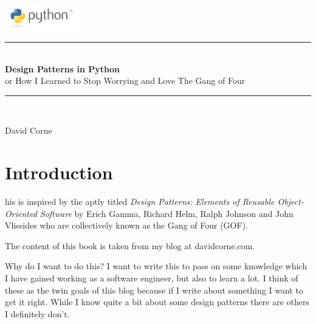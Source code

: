 \documentclass[12pt, oneside]{book} %
\newcommand{\HRule}{\rule{\linewidth}{0.5mm}} %
\begin{document}
\thispagestyle{empty}
\begin{center}
  \includegraphics[width=0.25\textwidth]{Images/Python_Logo.png}\\[1cm]
\end{center} 
\HRule \\[0.4cm]
       {\Huge \bfseries \color{RoyalBlue}Design Patterns in Python} \\[0.4cm]
       {\huge or How I Learned to Stop Worrying and Love The Gang of Four} \\[0.4cm]
\HRule \\[1.5cm]

\begin{minipage}{0.4\textwidth}
  \begin{flushleft}
    \Large David Corne
  \end{flushleft}
\end{minipage}

\vfill

\frontmatter

\mainmatter

\chapter{Introduction}
his is inspired by the aptly titled \emph{Design Patterns: Elements of Reusable Object-Oriented Software} by Erich Gamma, Richard Helm, Ralph Johnson and John Vlissides who are collectively known as the Gang of Four (GOF).

The content of this book is taken from my blog at davidcorne.com.

Why do I want to do this? I want to write this to pass on some knowledge which I have gained working as a software engineer, but also to learn a lot. I think of these as the twin goals of this blog because if I write about something I want to get it right. While I know quite a bit about some design patterns there are others I definitely don't.
\end{document}
